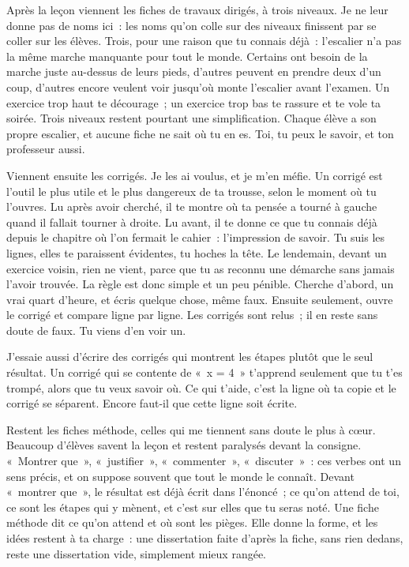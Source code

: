 \documentclass[10.5pt,twoside,openright]{book}
\begin{document}
Après la leçon viennent les fiches de travaux dirigés, à trois niveaux. Je ne leur donne pas de noms ici : les noms qu’on colle sur des niveaux finissent par se coller sur les élèves. Trois, pour une raison que tu connais déjà : l’escalier n’a pas la même marche manquante pour tout le monde. Certains ont besoin de la marche juste au-dessus de leurs pieds, d’autres peuvent en prendre deux d’un coup, d’autres encore veulent voir jusqu’où monte l’escalier avant l’examen. Un exercice trop haut te décourage ; un exercice trop bas te rassure et te vole ta soirée. Trois niveaux restent pourtant une simplification. Chaque élève a son propre escalier, et aucune fiche ne sait où tu en es. Toi, tu peux le savoir, et ton professeur aussi.

Viennent ensuite les corrigés. Je les ai voulus, et je m’en méfie. Un corrigé est l’outil le plus utile et le plus dangereux de ta trousse, selon le moment où tu l’ouvres. Lu après avoir cherché, il te montre où ta pensée a tourné à gauche quand il fallait tourner à droite. Lu avant, il te donne ce que tu connais déjà depuis le chapitre où l’on fermait le cahier : l’impression de savoir. Tu suis les lignes, elles te paraissent évidentes, tu hoches la tête. Le lendemain, devant un exercice voisin, rien ne vient, parce que tu as reconnu une démarche sans jamais l’avoir trouvée. La règle est donc simple et un peu pénible. Cherche d’abord, un vrai quart d’heure, et écris quelque chose, même faux. Ensuite seulement, ouvre le corrigé et compare ligne par ligne. Les corrigés sont relus ; il en reste sans doute de faux. Tu viens d’en voir un.

J’essaie aussi d’écrire des corrigés qui montrent les étapes plutôt que le seul résultat. Un corrigé qui se contente de « x = 4 » t’apprend seulement que tu t’es trompé, alors que tu veux savoir où. Ce qui t’aide, c’est la ligne où ta copie et le corrigé se séparent. Encore faut-il que cette ligne soit écrite.

Restent les fiches méthode, celles qui me tiennent sans doute le plus à cœur. Beaucoup d’élèves savent la leçon et restent paralysés devant la consigne. « Montrer que », « justifier », « commenter », « discuter » : ces verbes ont un sens précis, et on suppose souvent que tout le monde le connaît. Devant « montrer que », le résultat est déjà écrit dans l’énoncé ; ce qu’on attend de toi, ce sont les étapes qui y mènent, et c’est sur elles que tu seras noté. Une fiche méthode dit ce qu’on attend et où sont les pièges. Elle donne la forme, et les idées restent à ta charge : une dissertation faite d’après la fiche, sans rien dedans, reste une dissertation vide, simplement mieux rangée.
\end{document}
